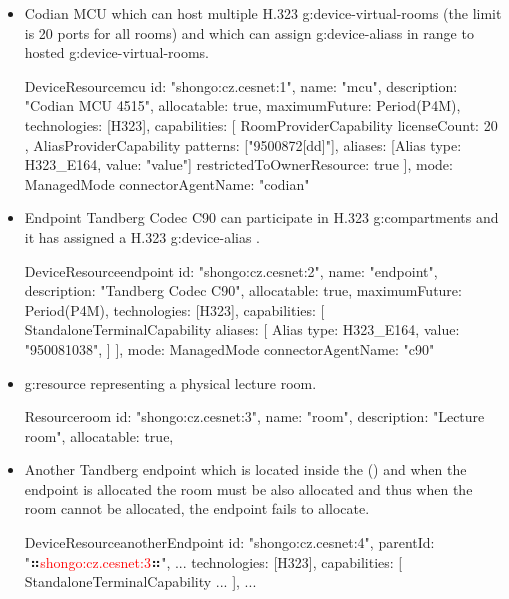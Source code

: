 \begin{itemize}

\item Codian MCU which can host multiple H.323 \glspl{g:device-virtual-room} (the limit is 20 ports for all rooms) and which can assign \glspl{g:device-alias} in range  to hosted \glspl{g:device-virtual-room}.

\begin{ObjectCode}{DeviceResource}{mcu}{}
id: "shongo:cz.cesnet:1",
name: "mcu",
description: "Codian MCU 4515",
allocatable: true,
maximumFuture: Period(P4M),
technologies: [H323],
capabilities: [
  RoomProviderCapability {
    licenseCount: 20
  },
  AliasProviderCapability {
    patterns: ["9500872[dd]"],
    aliases: [Alias { type: H323_E164, value: "{value}"}]
    restrictedToOwnerResource: true 
  }
],
mode: ManagedMode{
  connectorAgentName: "codian"
}
\end{ObjectCode}

\item Endpoint Tandberg Codec C90 can participate in H.323 \glspl{g:compartment} and it has assigned a H.323 \gls{g:device-alias} . 

\begin{ObjectCode}{DeviceResource}{endpoint}{}
id: "shongo:cz.cesnet:2",
name: "endpoint",
description: "Tandberg Codec C90",
allocatable: true,
maximumFuture: Period(P4M),
technologies: [H323],
capabilities: [
  StandaloneTerminalCapability {
    aliases: [
      Alias {
        type: H323_E164,
        value: "950081038",
      }
    ]
  }
],
mode: ManagedMode{
  connectorAgentName: "c90"
}
\end{ObjectCode}

\item \Gls{g:resource} representing a physical lecture room.

\begin{ObjectCode}{Resource}{room}{}
id: "shongo:cz.cesnet:3",
name: "room",
description: "Lecture room",
allocatable: true,
\end{ObjectCode}


\item Another Tandberg endpoint which is located inside the  () and when the endpoint is allocated the room must be also allocated and thus when the room cannot be allocated, the endpoint fails to allocate.

\begin{ObjectCode}{DeviceResource}{anotherEndpoint}{}
id: "shongo:cz.cesnet:4",
parentId: "⠶\textcolor{red}{shongo:cz.cesnet:3}⠶",
...
technologies: [H323],
capabilities: [
  StandaloneTerminalCapability {
    ...
  }
],
...
\end{ObjectCode}


\end{itemize}
